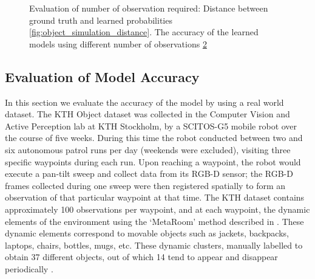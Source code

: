\begin{figure}
\begin{subfigure}[b]{0.4\textwidth}
        \caption{}
        \label{fig:object_simulation_accuracy}
    \end{subfigure}
    \caption[Evaluation of number of observation required]{Evaluation of number of observation required: Distance between ground truth and learned probabilities \ref{fig:object_simulation_distance}. The accuracy of the learned models using different number of observations \ref{fig:object_simulation_accuracy} }\label{fig:object_simulation_accuracy}
\end{figure}
\subsection*{Evaluation of Model Accuracy}

In this section we evaluate the accuracy of the model by using a real world dataset. The KTH Object dataset was collected in the Computer Vision and Active Perception lab at KTH Stockholm, by a SCITOS-G5 mobile robot over  the  course  of  five  weeks.  During  this  time  the  robot conducted  between  two  and  six  autonomous  patrol  runs per  day  (weekends  were  excluded),  visiting  three  specific waypoints  during  each  run.  Upon  reaching  a  waypoint,  the robot  would  execute  a  pan-tilt  sweep  and  collect  data  from its RGB-D sensor; the RGB-D frames collected during one sweep were then registered spatially to form an observation of  that  particular  waypoint  at  that  time.  The  KTH  dataset contains  approximately  100 observations  per  waypoint,  and at  each  waypoint, the  dynamic  elements  of the  environment  using  the  ‘MetaRoom’  method  described in \cite{ambrucs2014meta}. These  dynamic  elements  correspond  to  movable  objects such  as  jackets,  backpacks,  laptops,  chairs,  bottles,  mugs, etc. These dynamic clusters,  manually labelled  to obtain 37 different objects, out  of  which  14  tend  to  appear  and  disappear  periodically \cite{krajnik_wheres_2015}. 

